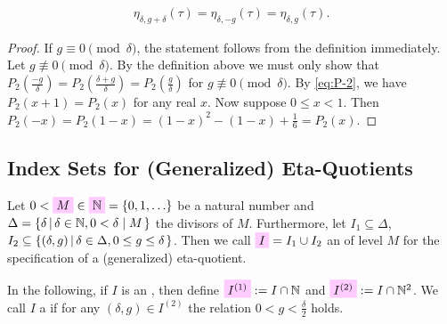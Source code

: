 \documentclass{article}
\begin{document}
\begin{Lemma}\label{thm:eta_delta-g/2}
  \begin{gather*}
    \eta_{\delta,g+\delta}(\tau)
      =
      \eta_{\delta,-g}(\tau)
      =
      \eta_{\delta,g}(\tau).
      \label{eq:eta_delta-g^[R](tau)-mod-delta}
  \end{gather*}
\end{Lemma}
\begin{proof}
  If $g \equiv 0 \pmod{\delta}$, the statement follows from the
  definition immediately.
  Let $g \not\equiv 0 \pmod{\delta}$.
  By the definition above we must only show that
  $P_2\left(\frac{-g}{\delta}\right) =
  P_2\left(\frac{\delta+g}{\delta}\right) =
  P_2\left(\frac{g}{\delta}\right)$ for
  $g \not\equiv 0 \pmod{\delta}$.
%
  By \eqref{eq:P-2}, we have $P_2(x+1) = P_2(x)$ for any real $x$.
  Now suppose $0\le x<1$. Then
  $
    P_2(-x)
    = P_2(1-x)
    = (1-x)^2 - (1-x) + \frac{1}{6}
    = P_2(x).
    $
\end{proof}










\subsection{Index Sets for (Generalized) Eta-Quotients}

\begin{Definition}
  \label{def:index-set}
  Let
  $0<\defineNotation{M}\in\defineNotation[N]{\setN}=\Set{0,1,\ldots}$
  be a natural number and
  $\Delta=\SetDef{\delta}{\delta\in\setN,0<\divides{\delta}{M}}$ the
  divisors of $M$.
%
  Furthermore, let $I_1 \subseteq \Delta$,
  $I_2 \subseteq \SetDef{(\delta,g)}{\delta\in\Delta,0\le g\le
    \delta}$. Then we call $\defineNotation[I]{I} = I_1 \cup I_2$ an
   of level $M$ for the specification of a
  (generalized) eta-quotient.

  In the following, if $I$ is an , then define
  $\defineNotation[I-1]{I^{(1)}} := I\cap\setN$ and
  $\defineNotation[I-2]{I^{(2)}} := I \cap \setN^2$.
%
  We call $I$ a  if for any
  $(\delta,g) \in I^{(2)}$ the relation $0<g<\frac{\delta}{2}$ holds.
\end{Definition}
\end{document}

